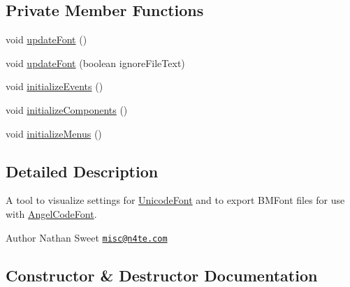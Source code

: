 \subsection*{Private Member Functions}
\begin{DoxyCompactItemize}
\item 
void \mbox{\hyperlink{classorg_1_1newdawn_1_1slick_1_1tools_1_1hiero_1_1_hiero_aaee4b931c33090913c970c8484c90af7}{update\+Font}} ()
\item 
void \mbox{\hyperlink{classorg_1_1newdawn_1_1slick_1_1tools_1_1hiero_1_1_hiero_aae5e5b00d0e71e6e629bc335df940d92}{update\+Font}} (boolean ignore\+File\+Text)
\item 
void \mbox{\hyperlink{classorg_1_1newdawn_1_1slick_1_1tools_1_1hiero_1_1_hiero_a542832d2b6b94a4fd1277d889b4ef8e2}{initialize\+Events}} ()
\item 
void \mbox{\hyperlink{classorg_1_1newdawn_1_1slick_1_1tools_1_1hiero_1_1_hiero_ab1e8c9a0d3d58decc8b860636d0d1606}{initialize\+Components}} ()
\item 
void \mbox{\hyperlink{classorg_1_1newdawn_1_1slick_1_1tools_1_1hiero_1_1_hiero_ace24ef1ee06277ff6a8437c249617e1d}{initialize\+Menus}} ()
\end{DoxyCompactItemize}


\subsection{Detailed Description}
A tool to visualize settings for \mbox{\hyperlink{classorg_1_1newdawn_1_1slick_1_1_unicode_font}{Unicode\+Font}} and to export B\+M\+Font files for use with \mbox{\hyperlink{classorg_1_1newdawn_1_1slick_1_1_angel_code_font}{Angel\+Code\+Font}}. \begin{DoxyAuthor}{Author}
Nathan Sweet \href{mailto:misc@n4te.com}{\tt misc@n4te.\+com} 
\end{DoxyAuthor}


\subsection{Constructor \& Destructor Documentation}
\mbox{\label{classorg_1_1newdawn_1_1slick_1_1tools_1_1hiero_1_1_hiero_ad35908dac0e9755fd418874dff6d2dcd}} 
